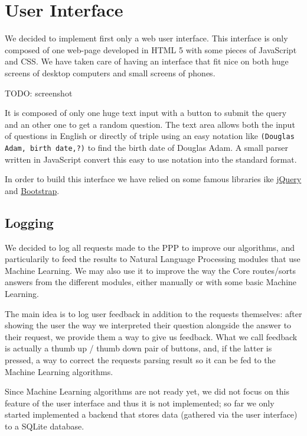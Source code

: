 \chapter{User Interface}

We decided to implement first only a web user interface. This interface
is only composed of one web-page developed in HTML 5 with some
pieces of JavaScript and CSS. We have taken care of having an
interface that fit nice on both huge screens of desktop computers
and small screens of phones.

TODO: screenshot 

It is composed of only one huge text input with a button to submit
the query and an other one to get a random question. The text area
allows both the input of questions in English or directly of triple using
an easy notation like \texttt{(Douglas Adam, birth date,?)} to find the
birth date of Douglas Adam. A small parser written in JavaScript convert
this easy to use notation into the standard format.

In order to build this interface we have relied on some famous libraries 
ike \href{http://jquery.com/}{jQuery} and \href{http://getbootstrap.com/}{Bootstrap}.

\section{Logging}

We decided to log all requests made to the PPP to improve our algorithms,
and particularily to feed the results to Natural Language Processing
modules that use Machine Learning.
We may also use it to improve the way the Core routes/sorts answers
from the different modules, either manually or with some basic
Machine Learning.

The main idea is to log user feedback in addition to the requests
themselves: after showing the user the way we interpreted their
question alongside the answer to their request, we provide them a
way to give us feedback.
What we call feedback is actually a thumb up / thumb down pair of
buttons, and, if the latter is pressed, a way to correct the requests
parsing result so it can be fed to the Machine Learning algorithms.

Since Machine Learning algorithms are not ready yet, we did not focus
on this feature of the user interface and thus it is not implemented;
so far we only started implemented a backend that stores data
(gathered via the user interface) to a SQLite database.
